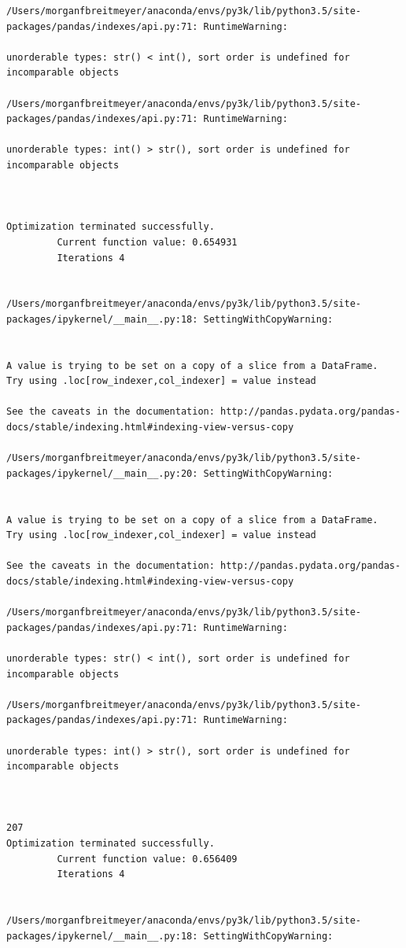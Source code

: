 \begin{lstlisting}
/Users/morganfbreitmeyer/anaconda/envs/py3k/lib/python3.5/site-packages/pandas/indexes/api.py:71: RuntimeWarning:

unorderable types: str() < int(), sort order is undefined for incomparable objects

/Users/morganfbreitmeyer/anaconda/envs/py3k/lib/python3.5/site-packages/pandas/indexes/api.py:71: RuntimeWarning:

unorderable types: int() > str(), sort order is undefined for incomparable objects



Optimization terminated successfully.
         Current function value: 0.654931
         Iterations 4


/Users/morganfbreitmeyer/anaconda/envs/py3k/lib/python3.5/site-packages/ipykernel/__main__.py:18: SettingWithCopyWarning:


A value is trying to be set on a copy of a slice from a DataFrame.
Try using .loc[row_indexer,col_indexer] = value instead

See the caveats in the documentation: http://pandas.pydata.org/pandas-docs/stable/indexing.html#indexing-view-versus-copy

/Users/morganfbreitmeyer/anaconda/envs/py3k/lib/python3.5/site-packages/ipykernel/__main__.py:20: SettingWithCopyWarning:


A value is trying to be set on a copy of a slice from a DataFrame.
Try using .loc[row_indexer,col_indexer] = value instead

See the caveats in the documentation: http://pandas.pydata.org/pandas-docs/stable/indexing.html#indexing-view-versus-copy

/Users/morganfbreitmeyer/anaconda/envs/py3k/lib/python3.5/site-packages/pandas/indexes/api.py:71: RuntimeWarning:

unorderable types: str() < int(), sort order is undefined for incomparable objects

/Users/morganfbreitmeyer/anaconda/envs/py3k/lib/python3.5/site-packages/pandas/indexes/api.py:71: RuntimeWarning:

unorderable types: int() > str(), sort order is undefined for incomparable objects



207
Optimization terminated successfully.
         Current function value: 0.656409
         Iterations 4


/Users/morganfbreitmeyer/anaconda/envs/py3k/lib/python3.5/site-packages/ipykernel/__main__.py:18: SettingWithCopyWarning:



\end{lstlisting}
